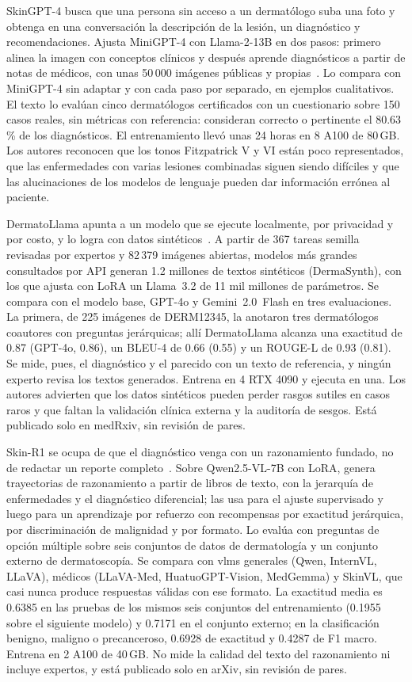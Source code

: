 SkinGPT-4 busca que una persona sin acceso a un dermatólogo suba una foto y obtenga en una conversación la
descripción de la lesión, un diagnóstico y recomendaciones. Ajusta MiniGPT-4 con Llama-2-13B en dos pasos: primero
alinea la imagen con conceptos clínicos y después aprende diagnósticos a partir de notas de médicos, con unas 50\,000
imágenes públicas y propias~\cite{zhou2024pretrained}. Lo compara con MiniGPT-4 sin adaptar y con
cada paso por separado, en ejemplos cualitativos. El texto lo evalúan cinco dermatólogos certificados con un cuestionario
sobre 150 casos reales, sin métricas con referencia: consideran correcto o pertinente el 80.63\,\% de los
diagnósticos. El entrenamiento llevó unas 24 horas en 8 A100 de 80\,GB. Los autores reconocen que los tonos
Fitzpatrick V y VI están poco representados, que las enfermedades con varias lesiones combinadas siguen siendo
difíciles y que las alucinaciones de los modelos de lenguaje pueden dar información errónea al paciente.

DermatoLlama apunta a un modelo que se ejecute localmente, por privacidad y por costo, y lo logra con datos
sintéticos~\cite{yilmaz2025resourceefficient}. A partir de 367 tareas semilla revisadas por expertos y 82\,379
imágenes abiertas, modelos más grandes consultados por API generan 1.2 millones de textos sintéticos (DermaSynth),
con los que ajusta con LoRA un Llama~3.2 de 11 mil millones de parámetros. Se compara con el modelo base, GPT-4o y
Gemini~2.0~Flash en tres evaluaciones. La primera, de 225 imágenes de DERM12345, la anotaron tres dermatólogos
coautores con preguntas jerárquicas; allí DermatoLlama alcanza una exactitud de 0.87 (GPT-4o, 0.86), un BLEU-4 de
0.66 (0.55) y un ROUGE-L de 0.93 (0.81). Se mide, pues, el diagnóstico y el parecido con un texto de referencia, y
ningún experto revisa los textos generados. Entrena en 4 RTX 4090 y ejecuta en una. Los autores advierten que los
datos sintéticos pueden perder rasgos sutiles en casos raros y que faltan la validación clínica externa y la
auditoría de sesgos. Está publicado solo en medRxiv, sin revisión de pares.

Skin-R1 se ocupa de que el diagnóstico venga con un razonamiento fundado, no de redactar un reporte
completo~\cite{liu2025skinr1}. Sobre Qwen2.5-VL-7B con LoRA, genera trayectorias de razonamiento a partir de libros
de texto, con la jerarquía de enfermedades y el diagnóstico diferencial; las usa para el ajuste supervisado y luego
para un aprendizaje por refuerzo con recompensas por exactitud jerárquica, por discriminación de malignidad y
por formato. Lo evalúa con preguntas de
opción múltiple sobre seis conjuntos de datos de dermatología y un conjunto externo de dermatoscopía. Se compara con
\glspl{vlm} generales (Qwen, InternVL, LLaVA), médicos (LLaVA-Med, HuatuoGPT-Vision, MedGemma) y SkinVL, que casi
nunca produce respuestas válidas con ese formato. La exactitud media es 0.6385 en las pruebas de los mismos seis conjuntos
del entrenamiento (0.1955 sobre el siguiente modelo) y 0.7171 en el conjunto externo; en la clasificación benigno, maligno o precanceroso, 0.6928 de
exactitud y 0.4287 de F1 macro. Entrena en 2 A100 de 40\,GB. No mide la calidad del texto del razonamiento ni
incluye expertos, y está publicado solo en arXiv, sin revisión de pares.

